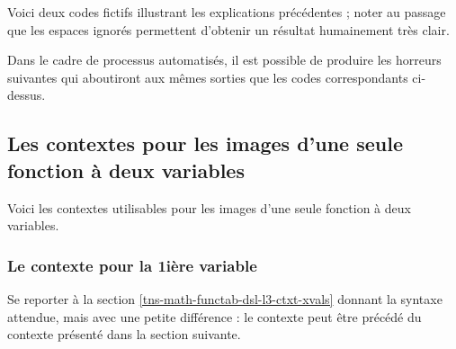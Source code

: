 

Voici deux codes fictifs illustrant les explications précédentes ; noter au passage que les espaces ignorés permettent d'obtenir un résultat humainement très clair.
\begin{multicols}{2}

\end{multicols}

Dans le cadre de processus automatisés, il est possible de produire les horreurs suivantes qui aboutiront aux mêmes sorties que les codes correspondants ci-dessus.
\begin{multicols}{2}

\end{multicols}



\subsection{Les contextes pour les images d'une seule fonction à deux variables}

Voici les contextes utilisables pour les images d'une seule fonction à deux variables.

\medskip

\begin{itemize*}[before = \leavevmode\kern15pt, itemjoin = \kern15pt]
	\item {}

	\item {}

	\item {}
\end{itemize*}




\subsubsection{Le contexte  pour la 1ière variable}

Se reporter à la section \ref{tns-math-functab-dsl-l3-ctxt-xvals} donnant la syntaxe attendue, mais avec une petite différence : le contexte  peut être précédé du contexte  présenté dans la section suivante.


